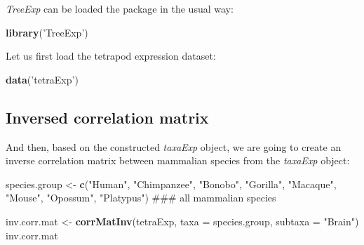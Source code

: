 \documentclass[]{book}
\newenvironment{Shaded}{\begin{snugshade}}{\end{snugshade}}
\newcommand{\DataTypeTok}[1]{\textcolor[rgb]{0.13,0.29,0.53}{#1}}
\newcommand{\KeywordTok}[1]{\textcolor[rgb]{0.13,0.29,0.53}{\textbf{#1}}}
\newcommand{\NormalTok}[1]{#1}
\newcommand{\StringTok}[1]{\textcolor[rgb]{0.31,0.60,0.02}{#1}}
\begin{document}
\emph{TreeExp} can be loaded the package in the usual way:

\begin{Shaded}
\begin{Highlighting}[]
\KeywordTok{library}\NormalTok{(}\StringTok{'TreeExp'}\NormalTok{)}
\end{Highlighting}
\end{Shaded}

Let us first load the tetrapod expression dataset:

\begin{Shaded}
\begin{Highlighting}[]
\KeywordTok{data}\NormalTok{(}\StringTok{'tetraExp'}\NormalTok{)}
\end{Highlighting}
\end{Shaded}

\hypertarget{inversed-correlation-matrix}{%
\subsection{Inversed correlation matrix}\label{inversed-correlation-matrix}}

And then, based on the constructed \emph{taxaExp} object, we are going to create an inverse correlation matrix between mammalian species from the \emph{taxaExp} object:

\begin{Shaded}
\begin{Highlighting}[]
\NormalTok{species.group <-}\StringTok{ }\KeywordTok{c}\NormalTok{(}\StringTok{"Human"}\NormalTok{, }\StringTok{"Chimpanzee"}\NormalTok{, }\StringTok{"Bonobo"}\NormalTok{, }\StringTok{"Gorilla"}\NormalTok{,}
\StringTok{"Macaque"}\NormalTok{, }\StringTok{"Mouse"}\NormalTok{, }\StringTok{"Opossum"}\NormalTok{, }\StringTok{"Platypus"}\NormalTok{)}
\NormalTok{### all mammalian species}

\NormalTok{inv.corr.mat <-}\StringTok{ }\KeywordTok{corrMatInv}\NormalTok{(tetraExp, }\DataTypeTok{taxa =}\NormalTok{ species.group, }\DataTypeTok{subtaxa =} \StringTok{"Brain"}\NormalTok{)}
\NormalTok{inv.corr.mat}
\end{Highlighting}
\end{Shaded}
\end{document}
